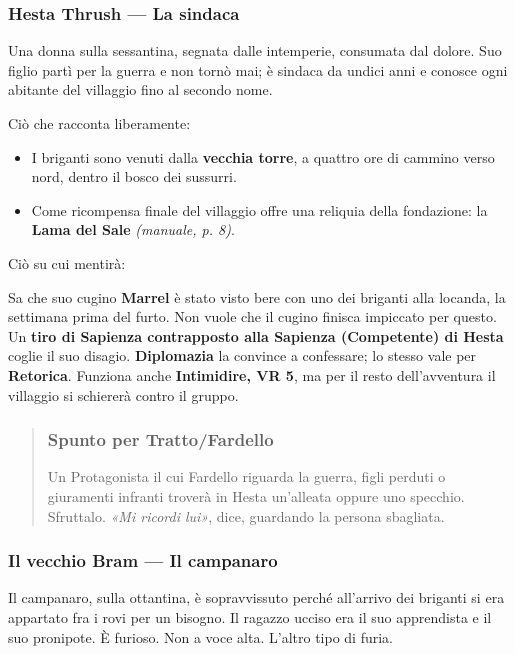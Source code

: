 \documentclass[10pt,a4paper]{article}
\newcommand{\tightlist}{\setlength{\itemsep}{0pt}\setlength{\parskip}{0pt}}
\begin{document}
\subsubsection{Hesta Thrush --- La sindaca}\label{hesta-thrush-la-sindaca}

Una donna sulla sessantina, segnata dalle intemperie, consumata dal dolore. Suo figlio partì per la guerra e non tornò mai; è sindaca da undici anni e conosce ogni abitante del villaggio fino al secondo nome.

Ciò che racconta liberamente:

\begin{itemize}
\tightlist
\item
  I briganti sono venuti dalla \textbf{vecchia torre}, a quattro ore di cammino verso nord, dentro il bosco dei sussurri.
\item
  Come ricompensa finale del villaggio offre una reliquia della fondazione: la \textbf{Lama del Sale} \emph{(manuale, p. 8)}.
\end{itemize}

Ciò su cui mentirà:

Sa che suo cugino \textbf{Marrel} è stato visto bere con uno dei briganti alla locanda, la settimana prima del furto. Non vuole che il cugino finisca impiccato per questo. Un \textbf{tiro di Sapienza contrapposto alla Sapienza (Competente) di Hesta} coglie il suo disagio. \textbf{Diplomazia} la convince a confessare; lo stesso vale per \textbf{Retorica}. Funziona anche \textbf{Intimidire, VR 5}, ma per il resto dell'avventura il villaggio si schiererà contro il gruppo.

\begin{quote}
\subsubsection{Spunto per Tratto/Fardello}\label{spunto-per-tratto-e-fardello}

Un Protagonista il cui Fardello riguarda la guerra, figli perduti o giuramenti infranti troverà in Hesta un'alleata oppure uno specchio. Sfruttalo. \emph{«Mi ricordi lui»}, dice, guardando la persona sbagliata.
\end{quote}

\subsubsection{Il vecchio Bram --- Il campanaro}\label{il-vecchio-bram-il-campanaro}

Il campanaro, sulla ottantina, è sopravvissuto perché all'arrivo dei briganti si era appartato fra i rovi per un bisogno. Il ragazzo ucciso era il suo apprendista e il suo pronipote. È furioso. Non a voce alta. L'altro tipo di furia.
\end{document}
